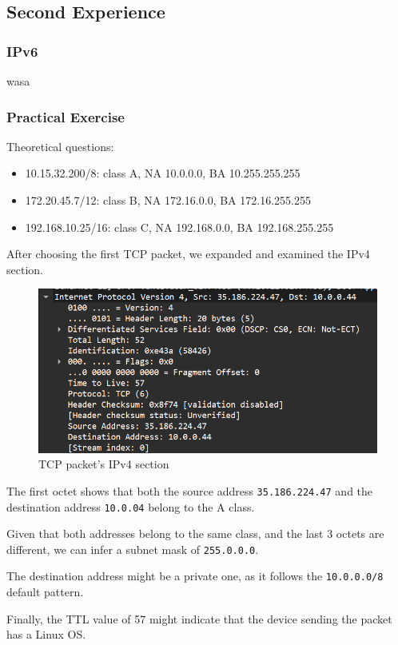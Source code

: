 \subsection{Second Experience}

\subsubsection{IPv6}
wasa

\subsubsection{Practical Exercise}

Theoretical questions:

\begin{itemize}
    \item 10.15.32.200/8: class A, NA 10.0.0.0, BA 10.255.255.255
    \item 172.20.45.7/12: class B, NA 172.16.0.0, BA 172.16.255.255
    \item 192.168.10.25/16: class C, NA 192.168.0.0, BA 192.168.255.255
\end{itemize}

After choosing the first TCP packet, we expanded and examined the IPv4 section.

\begin{figure}[htbp]
    \centering
    \includegraphics[width=1\linewidth]{img/2/6_1.png}
    \caption{TCP packet's IPv4 section}\label{fig:exp2_6_1}
\end{figure}

The first octet shows that both the source address \texttt{35.186.224.47} and
the destination address \texttt{10.0.04} belong to the A class.

Given that both addresses belong to the same class, and the last 3 octets are
different, we can infer a subnet mask of \texttt{255.0.0.0}.

The destination address might be a private one, as it follows the
\texttt{10.0.0.0/8} default pattern.

Finally, the TTL value of 57 might indicate that the device sending the packet
has a Linux OS.